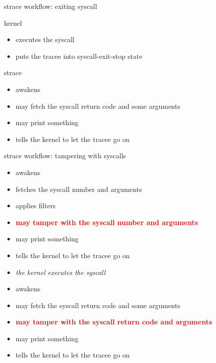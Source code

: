 \documentclass[unicode]{beamer}
\begin{document}
\begin{frame}{strace workflow: exiting syscall}
\begin{block}{\large kernel}
\begin{itemize}
	\item executes the syscall
	\item puts the tracee into {\sc syscall-exit-stop} state
\end{itemize}
\end{block}
\begin{block}{\large strace}
\begin{itemize}
	\item awakens
	\item may fetch the syscall return code and some arguments
	\item may print something
	\item tells the kernel to let the tracee go on
\end{itemize}
\end{block}
\end{frame}

\begin{frame}{strace workflow: tampering with syscalls}
\begin{itemize}
	\item awakens
	\item fetches the syscall number and arguments
	\item applies filters
	\item \textcolor{red}{\bf may tamper with the syscall number and arguments}
	\item may print something
	\item tells the kernel to let the tracee go on
	\item {\it the kernel executes the syscall}
	\item awakens
	\item may fetch the syscall return code and some arguments
	\item \textcolor{red}{\bf may tamper with the syscall return code and arguments}
	\item may print something
	\item tells the kernel to let the tracee go on
\end{itemize}
\end{frame}
\end{document}
